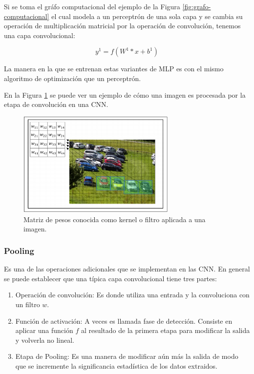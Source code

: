 	Si se toma el gráfo computacional del ejemplo de la Figura \ref{fig:grafo-computacional} el cual modela a un perceptrón de una sola capa y se cambia su operación de multiplicación matricial por la operación de convolución, tenemos una capa convolucional:

	\begin{equation}
		y ^ {1} = f(W ^ {1} * x + b ^ {1}) 
	\end{equation}

	La manera en la que se entrenan estas variantes de MLP es con el mismo algoritmo de optimización que un perceptrón.
    
    En la Figura \ref{fig:CNNFilter} se puede ver un ejemplo de cómo una imagen es procesada por la etapa de convolución en una CNN.
    
    \begin{figure}[H]
    	\centering
    	\includegraphics[width=0.7\textwidth]{capitulo2/images/CNN_window.png}
    	\caption{Matriz de pesos conocida como kernel o filtro aplicada a una imagen.}
    	\label{fig:CNNFilter}
    \end{figure}
    
    \subsubsection{Pooling}
    Es una de las operaciones adicionales que se implementan en las CNN. En general se puede establecer que una típica capa convolucional tiene tres partes:
    
    \begin{enumerate}
    	\item Operación de convolución: Es donde utiliza una entrada y la convoluciona con un filtro $w$.
    	\item Función de activación: A veces es llamada fase de detección. Consiste en aplicar una función $f$ al resultado de la primera etapa para modificar la salida y volverla no lineal.
    	\item Etapa de Pooling: Es una manera de modificar aún más la salida de modo que se incremente la significancia estadística de los datos extraidos.
    \end{enumerate}

